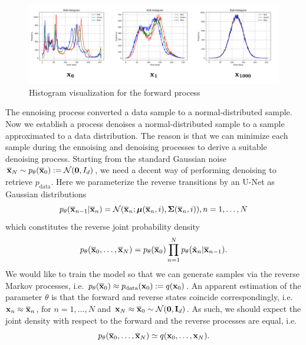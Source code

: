 \begin{figure}[H]
 \centering
 \includegraphics[width = \textwidth]{img/Histogram.png}
 \vspace{0.1cm}
 \caption{Histogram visualization for the forward process}
 \label{figure:Histogram}
\end{figure}

The ennoising process converted a data sample to a normal-distributed sample. Now we establish a process denoises a normal-distributed sample to a sample approximated to a data distribution. The reason is that we can minimize each sample during the ennoising and denoising processes to derive a suitable denoising process. Starting from the standard Gaussian noise $\overline{\mathbf{x}}_N\sim p_\theta(\overline{\mathbf{x}}_0):=\mathcal{N}(\mathbf{0},I_d)$, we need a decent way of performing denoising to retrieve $p_\text{data}$. Here we parameterize the reverse transitions by an U-Net \cite{ho2020denoising} as Gaussian distributions
\begin{equation}
 \label{equation:ddpm_reveverse}
 p_\theta(\overline{\mathbf{x}}_{n-1}|\overline{\mathbf{x}}_{n})=\mathcal{N}(\overline{\mathbf{x}}_n;\bm{\mu}(\overline{\mathbf{x}}_{n},i),\bm{\Sigma}(\overline{\mathbf{x}}_{n},i)), n=1,\ldots,N
\end{equation}
which constitutes the reverse joint probability density
\begin{equation}
 p_\theta(\overline{\mathbf{x}}_0,\ldots,\overline{\mathbf{x}}_N)=p_\theta(\overline{\mathbf{x}}_0)\prod\limits_{n=1}^Np_\theta(\Tilde{\mathbf{x}}_n|\overline{\mathbf{x}}_{n-1}).
\end{equation}
We would like to train the model so that we can generate samples via the reverse Markov processes, i.e. $p_\theta(\overline{\mathbf{x}}_0)\approx p_{\text{data}}(\mathbf{x}_0):=q(\mathbf{x}_0)$. An
apparent estimation of the parameter $\theta$ is that the forward and reverse states coincide correspondingly, i.e. $\mathbf{x}_n\approx\overline{\mathbf{x}}_{n}$, for $n=1,\ldots,N$ and $\mathbf{x}_N\approx\overline{\mathbf{x}}_{0}\sim\mathcal{N}(\mathbf{0},\mathbf{I}_d)$. As such, we should
expect the joint density with respect to the forward and the reverse processes are equal, i.e.
$$p_\theta(\overline{\mathbf{x}}_0,\ldots,\overline{\mathbf{x}}_N)\simeq q(\mathbf{x}_0,\ldots,\mathbf{x}_N).$$

